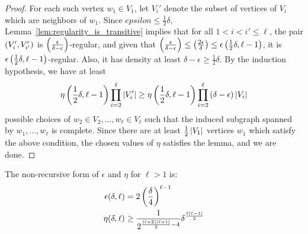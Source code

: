 \begin{proof}
            For each such vertex $w_1 \in V_1$, let $V_i'$ denote the subset of vertices of $V_i$ which are neighbors
            of $w_1$.
            Since $epsilon \leq \frac{1}{2}\delta$, Lemma~\ref{lem:regularity_is_transitive} implies that for all
            $1 < i < i' \leq \ell$, the pair $\left( V_i', V_{i'}' \right)$ is $\left( \frac{\epsilon}{\delta-\epsilon} \right)$-regular,
            and given that $\left( \frac{\epsilon}{\delta-\epsilon} \right) \leq \left( \frac{2\epsilon}{\delta} \right) \leq \epsilon\left( \frac{1}{2}\delta, \ell-1 \right)$,
            it is $\epsilon\left( \frac{1}{2}\delta, \ell-1 \right)$-regular.
            Also, it has density at least $\delta - \epsilon \geq \frac{1}{2} \delta$.
            By the induction hypothesis, we have at least
            \[
                \eta \left( \frac{1}{2}\delta, \ell-1 \right) \prod_{i=2}^\ell \left| V_i' \right|
                    \geq \eta \left( \frac{1}{2}\delta, \ell-1 \right) \prod_{i=2}^\ell \left( \delta - \epsilon \right) \left| V_i \right|
            \]
            possible choices of $w_2 \in V_2, \dots, w_\ell \in V_\ell$ such that the induced subgraph spanned by
            $w_1, \dots, w_\ell$ is complete.
            Since there are at least $\frac{1}{2} \left| V_1 \right|$ vertices $w_1$ which satisfy the above condition,
            the chosen values of $\eta$ satisfies the lemma, and we are done.
        \end{proof}

    \begin{remark}
        The non-recursive form of $\epsilon$ and $\eta$ for $\ell > 1$ is:
        \begin{align*}
            \epsilon(\delta, \ell) & = 2 \left( \frac{\delta}{4} \right)^{\ell-1} \\
            \eta(\delta, \ell) & \geq \frac{1}{2^{\frac{(\ell+2)(\ell+1)}{2}-4}} \delta^{\frac{\ell(\ell-1)}{2}}
        \end{align*}
    \end{remark}

